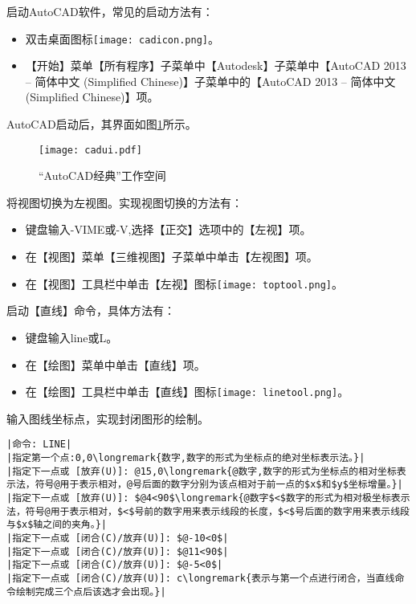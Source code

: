 \begin{procedure}
\item 启动AutoCAD软件，常见的启动方法有：
\begin{itemize}
\item 双击桌面图标\texttt{[image: cadicon.png]}。
\item 【开始】菜单【所有程序】子菜单中【Autodesk】子菜单中【AutoCAD 2013 – 简体中文 (Simplified Chinese)】子菜单中的【AutoCAD 2013 – 简体中文 (Simplified Chinese)】项。
\end{itemize}
AutoCAD启动后，其界面如图\ref{fig:cadui}所示。
\noindent
\begin{figure}[htbp]
\centering
\texttt{[image: cadui.pdf]}
\caption{“AutoCAD经典”工作空间}\label{fig:cadui}
\end{figure}
\item 将视图切换为左视图。实现视图切换的方法有：
\begin{itemize}
\item 键盘输入-VIME或-V,选择【正交】选项中的【左视】项。
\item 在【视图】菜单【三维视图】子菜单中单击【左视图】项。
\item 在【视图】工具栏中单击【左视】图标\texttt{[image: toptool.png]}。
\end{itemize}
\item 启动【直线】命令，具体方法有：
\begin{itemize}
\item 键盘输入line或L。
\item 在【绘图】菜单中单击【直线】项。
\item 在【绘图】工具栏中单击【直线】图标\texttt{[image: linetool.png]}。
\end{itemize}
\item 输入图线坐标点，实现封闭图形的绘制。

\begin{lstlisting}
|命令: LINE|
|指定第一个点:0,0\longremark{数字,数字的形式为坐标点的绝对坐标表示法。}|
|指定下一点或 [放弃(U)]: @15,0\longremark{@数字,数字的形式为坐标点的相对坐标表示法，符号@用于表示相对，@号后面的数字分别为该点相对于前一点的$x$和$y$坐标增量。}|
|指定下一点或 [放弃(U)]: $@4<90$\longremark{@数字$<$数字的形式为相对极坐标表示法，符号@用于表示相对，$<$号前的数字用来表示线段的长度，$<$号后面的数字用来表示线段与$x$轴之间的夹角。}|
|指定下一点或 [闭合(C)/放弃(U)]: $@-10<0$|
|指定下一点或 [闭合(C)/放弃(U)]: $@11<90$|
|指定下一点或 [闭合(C)/放弃(U)]: $@-5<0$|
|指定下一点或 [闭合(C)/放弃(U)]: c\longremark{表示与第一个点进行闭合，当直线命令绘制完成三个点后该选才会出现。}|
\end{lstlisting}
\end{procedure}

